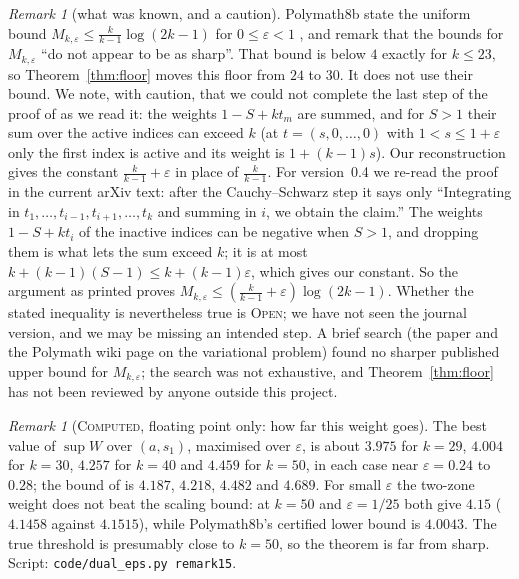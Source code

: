 \documentclass[11pt]{amsart}
\theoremstyle{definition}
\theoremstyle{remark}
\newtheorem{remark}[theorem]{Remark}
\newcommand{\lbl}[1]{\textup{\textsc{#1}}}
\begin{document}
\begin{remark}[what was known, and a caution]
Polymath8b state the uniform bound $M_{k,\varepsilon}\le\frac{k}{k-1}\log(2k-1)$
for $0\le\varepsilon<1$ \cite[Prop.~6.5]{Pol14b}, and remark that the bounds
for $M_{k,\varepsilon}$ ``do not appear to be as sharp''. That bound is below
$4$ exactly for $k\le23$, so Theorem~\ref{thm:floor} moves this floor from $24$
to $30$. It does not use their bound. We note, with caution, that we could not
complete the last step of the proof of \cite[Prop.~6.5]{Pol14b} as we read it:
the weights $1-S+kt_m$ are summed, and for $S>1$ their sum over the active
indices can exceed $k$ (at $t=(s,0,\dots,0)$ with $1<s\le1+\varepsilon$ only
the first index is active and its weight is $1+(k-1)s$). Our reconstruction
gives the constant $\frac{k}{k-1}+\varepsilon$ in place of $\frac{k}{k-1}$. For
version~0.4 we re-read the proof in the current arXiv text: after the
Cauchy--Schwarz step it says only ``Integrating in $t_1,\dots,t_{i-1},
t_{i+1},\dots,t_k$ and summing in $i$, we obtain the claim.'' The weights
$1-S+kt_i$ of the inactive indices can be negative when $S>1$, and dropping
them is what lets the sum exceed $k$; it is at most
$k+(k-1)(S-1)\le k+(k-1)\varepsilon$, which gives our constant. So the
argument as printed proves $M_{k,\varepsilon}\le\left(\frac{k}{k-1}+\varepsilon\right)\log(2k-1)$.
Whether the stated inequality is nevertheless true is \lbl{Open}; we have not
seen the journal version, and we may be missing an intended step. A
brief search (the paper \cite{Pol14b} and the Polymath wiki page on the
variational problem) found no sharper published upper bound for
$M_{k,\varepsilon}$; the search was not exhaustive, and
Theorem~\ref{thm:floor} has not been reviewed by anyone outside this project.
\end{remark}

\begin{remark}[\lbl{Computed}, floating point only: how far this weight goes]
The best value of $\sup W$ over $(a,s_1)$, maximised over $\varepsilon$, is
about $3.975$ for $k=29$, $4.004$ for $k=30$, $4.257$ for $k=40$ and $4.459$
for $k=50$, in each case near $\varepsilon=0.24$ to $0.28$; the bound of
\cite[Prop.~6.5]{Pol14b} is $4.187$, $4.218$, $4.482$ and $4.689$. For small
$\varepsilon$ the two-zone weight does not beat the scaling bound: at $k=50$
and $\varepsilon=1/25$ both give $4.15$ ($4.1458$ against $4.1515$), while
Polymath8b's certified lower bound is $4.0043$. The true threshold is presumably
close to $k=50$, so the theorem is far from sharp. Script:
\texttt{code/dual\_eps.py remark15}.
\end{remark}
\end{document}
